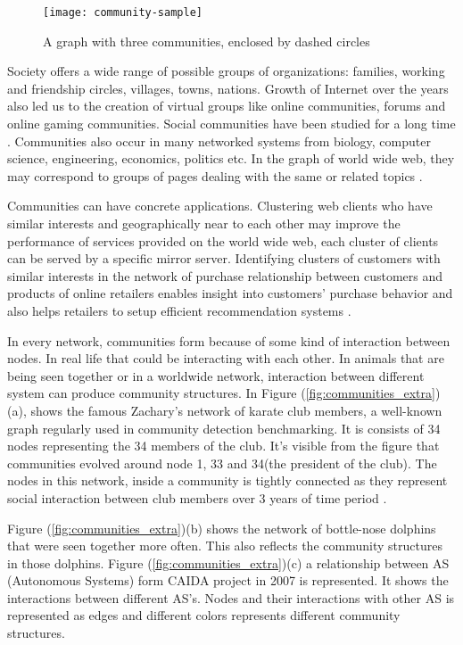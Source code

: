 \vfill
\pagebreak

\begin{figure}[H]
	\centering
	\texttt{[image: community-sample]}
	\caption{A graph with three communities, enclosed by dashed circles}
	\label{fig:a_sample_community}
\end{figure}

Society offers a wide range of possible groups of organizations: families, working and friendship circles, villages, towns, nations. Growth of Internet over the years also led us to the creation of virtual groups like online communities, forums and online gaming communities. Social communities have been studied for a long time \cite{ref-6}. Communities also occur in many networked systems from biology, computer science, engineering, economics, politics etc. In the graph of world wide web, they may correspond to groups of pages dealing with the same or related topics \cite{ref-36}.

Communities can have concrete applications. Clustering web clients who have similar interests and geographically near to each other may improve the performance of services provided on the world wide web, each cluster of clients can be served by a specific mirror server. Identifying clusters of customers with similar interests in the network of purchase relationship between customers and products of online retailers enables insight into customers' purchase behavior and also helps retailers to setup efficient recommendation systems \cite{ref-37}.

In every network, communities form because of some kind of interaction between nodes. In real life that could be interacting with each other. In animals that are being seen together or in a worldwide network, interaction between different system can produce community structures. In Figure (\ref{fig:communities_extra})(a), shows the famous Zachary's network of karate club members, a well-known graph regularly used in community detection benchmarking. It is consists of 34 nodes representing the 34 members of the club. It's visible from the figure that communities evolved around node 1, 33 and 34(the president of the club). The nodes in this network, inside a community is tightly connected as they represent social interaction between club members over 3 years of time period \cite{ref-58}.

Figure (\ref{fig:communities_extra})(b) shows the network of bottle-nose dolphins that were seen together more often. This also reflects the community structures in those dolphins. Figure (\ref{fig:communities_extra})(c) a relationship between AS (Autonomous Systems) form CAIDA project in 2007 is represented. It shows the interactions between different AS's. Nodes and their interactions with other AS is represented as edges and different colors represents different community structures.

